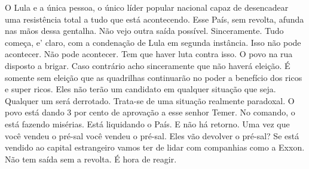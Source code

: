  O Lula e a única pessoa, o único líder popular nacional capaz de
desencadear uma resistência total a tudo que está acontecendo. Esse
País, sem revolta, afunda nas mãos dessa gentalha. Não vejo outra saída
possível. Sinceramente. Tudo começa, e' claro, com a condenação de Lula
em segunda instância. Isso não pode acontecer. Não pode acontecer. Tem
que haver luta contra isso. O povo na rua disposto a brigar. Caso
contrário acho sinceramente que não haverá eleição. É somente sem
eleição que as quadrilhas continuarão no poder a benefício dos ricos e
super ricos. Eles não terão um candidato em qualquer situação que seja.
Qualquer um será derrotado. Trata-se de uma situação realmente
paradoxal. O povo está dando 3 por cento de aprovação a esse senhor
Temer. No comando, o está fazendo misérias. Está liquidando o País. E
não há retorno. Uma vez que você vendeu o pré-sal você vendeu o pré-sal.
Eles vão devolver o pré-sal? Se está vendido ao capital estrangeiro
vamos ter de lidar com companhias como a Exxon. Não tem saída sem a
revolta. É hora de reagir.
